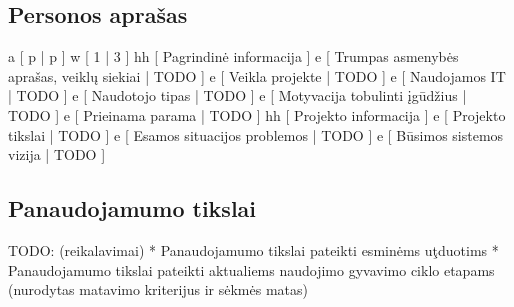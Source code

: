 \subsection{Personos aprašas}
\xtable
{
  a [ p | p ]
  w [ 1 | 3 ]
  hh [ Pagrindinė informacija ]
  e [ Trumpas asmenybės aprašas, veiklų siekiai | TODO ]
  e [ Veikla projekte | TODO ]
  e [ Naudojamos IT | TODO ]
  e [ Naudotojo tipas | TODO ]
  e [ Motyvacija tobulinti įgūdžius | TODO ]
  e [ Prieinama parama | TODO ]
  hh [ Projekto informacija ]
  e [ Projekto tikslai | TODO ]
  e [ Esamos situacijos problemos | TODO ]
  e [ Būsimos sistemos vizija | TODO  ]
}

\subsection{Panaudojamumo tikslai}
TODO: (reikalavimai)
* Panaudojamumo tikslai pateikti esminėms uţduotims
* Panaudojamumo tikslai pateikti aktualiems naudojimo gyvavimo ciklo
etapams (nurodytas matavimo kriterijus ir sėkmės matas)
